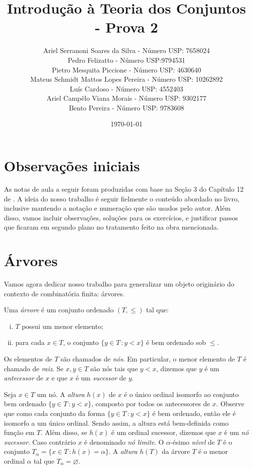 \documentclass[a4paper]{article}
\title{Introdução à Teoria dos Conjuntos - Prova 2}
\author{Ariel Serranoni Soares da Silva  - Número USP: 7658024\\
Pedro Felizatto - Número USP:9794531\\
Pietro Mesquita Piccione - Número USP: 4630640\\
Mateus Schmidt Mattos Lopes Pereira - Número USP: 10262892\\
Luís Cardoso - Número USP: 4552403\\
Ariel Campêlo Viana Morais - Número USP: 9302177\\
Bento Pereira - Número USP: 9783608}
\date{\today}
\begin{document}
\maketitle

\section*{Observações iniciais}

As notas de aula a seguir foram produzidas com base na Seção 3 do Capítulo 12 de
\cite{jech}. A ideia do nosso trabalho é seguir fielmente o conteúdo abordado no
livro, inclusive mantendo a notação e numeração que são usados pelo autor.
Além disso, vamos incluir observações, soluções para os exercícios, e justificar
passos que ficaram em segundo plano no tratamento feito na obra mencionada.

\setcounter{section}{2}
\section{Árvores}

Vamos agora dedicar
nosso trabalho para generalizar um objeto originário do
contexto de combinatória finita: árvores.

\begin{definition}
  Uma \emph{árvore} é um conjunto ordenado \((T,\leq)\) tal que:
 \begin{enumerate}[(i)]
  \item \(T\) possui um menor elemento;
  \item para cada \(x\in T\), o conjunto \(\{y\in T\,\colon y<x\}\) é bem
    ordenado sob \(\leq\).
  \end{enumerate}
\end{definition}
Os elementos de \(T\) são chamados de \emph{nós}. Em particular,
o menor elemento de \(T\) é chamado  de \emph{raiz}.
Se \(x,y\in T\) são nós tais que  \(y<x\), dizemos que \(y\) é um
\emph{antecessor} de \(x\) e que \(x\) é um \emph{sucessor} de \(y\).

Seja \(x\in T\) um nó.  A \emph{altura} \(h(x)\) de \(x\) é o único ordinal
isomorfo ao conjunto bem ordenado \mbox{\(\{y\in T\,\colon
  y<x\}\),} composto por todos os antecessores de \(x\). Observe que como
cada conjunto da forma \(\{y\in T\,\colon y<x\}\) é bem ordenado,
então ele é isomorfo a um único ordinal. Sendo assim, a altura está
bem-definida como função em \(T\).
Além disso, se \(h(x)\) é um ordinal sucessor, dizemos que \(x\) é um
\emph{nó sucessor}. Caso contrário \(x\) é denominado \emph{nó limite}.
O \(\alpha\)-ésimo \emph{nível} de \(T\) é o conjunto
\(T_\alpha=\{x\in T \,\colon h(x)=\alpha\}\). A \emph{altura} \(h(T)\) da árvore
\(T\) é o menor ordinal \(\alpha\) tal que \(T_\alpha=\varnothing\).  
\end{document}
